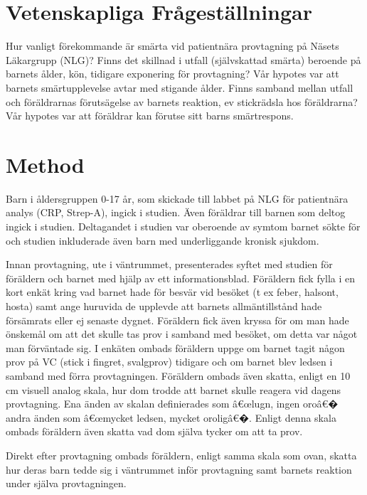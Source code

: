 \documentclass[12pt,twocolumn]{article}
\begin{document}
\section{Vetenskapliga Fr\r{a}gest\"allningar}

Hur vanligt f\"orekommande \"ar sm\"arta vid patientn\"ara provtagning p\r{a}
N\"asets L\"akargrupp (NLG)?
Finns det skillnad i utfall (sj\"alvskattad sm\"arta) beroende p\r{a} barnets
\r{a}lder, k\"on, tidigare exponering f\"or provtagning? V\r{a}r hypotes var att
barnets sm\"artupplevelse avtar med stigande \r{a}lder.
Finns samband mellan utfall och f\"or\"aldrarnas f\"oruts\"agelse av barnets
reaktion, ev stickr\"adsla hos f\"or\"aldrarna? V\r{a}r hypotes var att
f\"or\"aldrar kan f\"orutse sitt barns sm\"artrespons.

\section{Method}

Barn i \r{a}ldersgruppen 0-17 \r{a}r, som skickade till labbet p\r{a} NLG f\"or
patientn\"ara analys (CRP, Strep-A), ingick i studien. \"Aven f\"or\"aldrar till
barnen som deltog ingick i studien. Deltagandet i studien var oberoende av
symtom barnet s\"okte f\"or och studien inkluderade \"aven barn med
underliggande kronisk sjukdom.

Innan provtagning, ute i v\"antrummet, presenterades syftet med studien f\"or
f\"or\"aldern och barnet med hj\"alp av ett informationsblad. F\"or\"aldern fick
fylla i en kort enk\"at kring vad barnet hade f\"or besv\"ar vid bes\"oket (t ex
feber, halsont, hosta) samt ange huruvida de upplevde att barnets
allm\"antillst\r{a}nd hade f\"ors\"amrats eller ej senaste dygnet. F\"or\"aldern
fick \"aven kryssa f\"or om man hade \"onskem\r{a}l om att det skulle tas prov i
samband med bes\"oket, om detta var n\r{a}got man f\"orv\"antade sig. I
enk\"aten ombads f\"or\"aldern uppge om barnet tagit n\r{a}gon prov p\r{a} VC
(stick i fingret, svalgprov) tidigare och om barnet blev ledsen i samband med
f\"orra provtagningen. F\"or\"aldern ombads \"aven skatta, enligt en 10 cm
visuell analog skala, hur dom trodde att barnet skulle reagera vid dagens
provtagning.
Ena \"anden av skalan definierades som â€œlugn, ingen oroâ€� andra \"anden som
â€œmycket ledsen, mycket oroligâ€�. Enligt denna skala ombads f\"or\"aldern \"aven
skatta vad dom sj\"alva tycker om att ta prov.

Direkt efter provtagning ombads f\"or\"aldern, enligt samma skala som ovan,
skatta hur deras barn tedde sig i v\"antrummet inf\"or provtagning samt barnets
reaktion under sj\"alva provtagningen.
\end{document}
